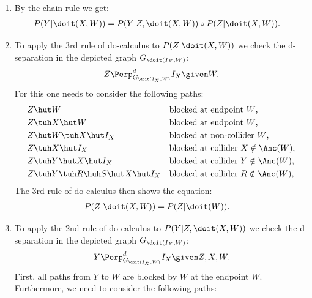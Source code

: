 {\begin{enumerate}
    \item By the chain rule we get:
        \begin{align*}
            P(Y|\doit(X,W)) &= P(Y|Z,\doit(X,W)) \circ P(Z|\doit(X,W)).
        \end{align*}
          \item To apply the 3rd rule of do-calculus to $P(Z|\doit(X,W))$ we check the d-separation in the depicted graph $G_{\doit(I_X,W)}$:
         \begin{align*}
             Z \Perp^d_{G_{\doit(I_X,W)}} I_X \given W.
         \end{align*}
         For this one needs to consider the following paths:
         \begin{align*}
             &Z \hut W          && \text{blocked at endpoint $W$,} \\
             &Z \tuh X \hut W   && \text{blocked at endpoint $W$,} \\
             &Z \hut W \tuh X \hut I_X   && \text{blocked at non-collider $W$,} \\
             &Z \tuh X \hut I_X && \text{blocked at collider $X \notin \Anc(W)$,}\\
             &Z \tuh Y \hut X \hut I_X && \text{blocked at collider $Y \notin \Anc(W)$,}\\
             &Z \tuh Y \tuh R \huh S \hut X \hut I_X && \text{blocked at collider $R \notin \Anc(W)$,}
         \end{align*}
         The 3rd rule of do-calculus then shows the equation:
         \begin{align*}
             P(Z|\doit(X,W)) & = P(Z|\doit(W)).
         \end{align*}
     \item To apply the 2nd rule of do-calculus to $P(Y|Z,\doit(X,W))$ we check the d-separation in the depicted graph $G_{\doit(I_X,W)}$: 
         \begin{align*}
             Y \Perp^d_{G_{\doit(I_X,W)}} I_X \given Z,X,W.
         \end{align*}
         First, all paths from $Y$ to $W$ are blocked by $W$ at the endpoint $W$.
         Furthermore, we need to consider the following paths:
         \begin{align*}

\end{align*}
\end{enumerate}}
